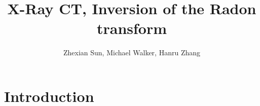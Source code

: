 \documentclass[report]{IEEEtran}
\title{X-Ray CT, Inversion of the Radon transform}
\author{Zhexian Sun, Michael Walker, Hanru Zhang}
\begin{document}
	\maketitle
	
	\section{Introduction}
	
	
	
	
		
\end{document}
